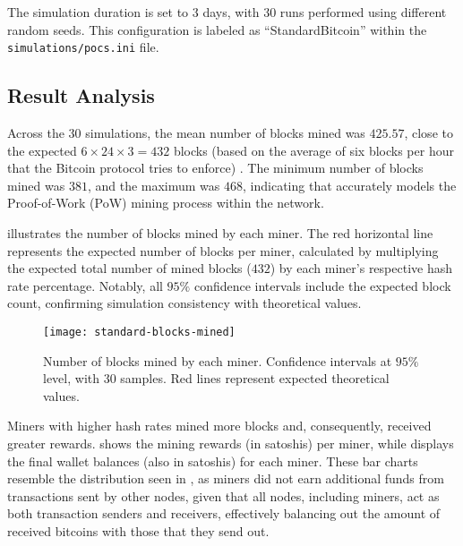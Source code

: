 The simulation duration is set to 3 days, with 30 runs performed using
different random seeds. This configuration is labeled as ``StandardBitcoin''
within the \texttt{simulations/pocs.ini} file.

\subsection{Result Analysis}\label{subsec:general-analysis}

Across the 30 simulations, the mean number of blocks mined was \(425.57\),
close to the expected \(6 \times 24 \times 3 = 432\) blocks (based on the
average of six blocks per hour that the Bitcoin protocol tries to enforce)
\cite[Chapter~``Difficulty'']{learnmeabitcoin}. The minimum number of blocks
mined was \(381\), and the maximum was \(468\), indicating that \iblock{}
accurately models the Proof-of-Work (PoW) mining process within the network.

 illustrates the number of blocks mined by
each miner. The red horizontal line represents the expected number of blocks
per miner, calculated by multiplying the expected total number of mined blocks
(\(432\)) by each miner’s respective hash rate percentage. Notably, all
\(95\%\) confidence intervals include the expected block count, confirming
simulation consistency with theoretical values.

\begin{figure}[tbhp]
	\centering
	\texttt{[image: standard-blocks-mined]}
	\caption{Number of blocks mined by each miner. Confidence intervals at
	\(95\%\) level, with 30 samples. Red lines represent expected
	theoretical values.}\label{fig:general-blocks-mined}
\end{figure}

Miners with higher hash rates mined more blocks and, consequently, received
greater rewards.  shows the mining rewards (in
satoshis) per miner, while  displays the final
wallet balances (also in satoshis) for each miner. These bar charts resemble
the distribution seen in , as miners did not
earn additional funds from transactions sent by other nodes, given that all
nodes, including miners, act as both transaction senders and receivers,
effectively balancing out the amount of received bitcoins with those that they
send out.

